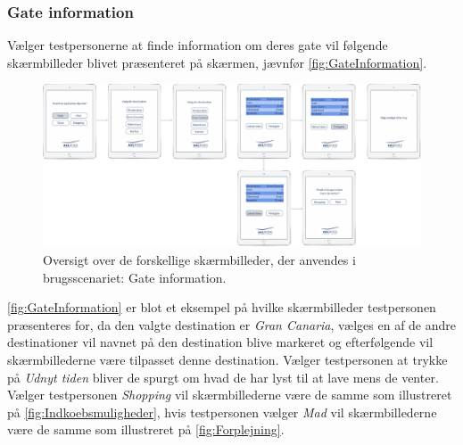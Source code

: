 \subsubsection*{Gate information}
%
Vælger testpersonerne at finde information om deres gate vil følgende skærmbilleder blivet præsenteret på skærmen, jævnfør \autoref{fig:GateInformation}. 
%
\begin{figure}[H]
\centering
\includegraphics[width = \textwidth]{Figure/TestdesignParametre/GateInformation} 
\caption{Oversigt over de forskellige skærmbilleder, der anvendes i brugsscenariet: Gate information.}
\label{fig:GateInformation}
\end{figure}
\noindent
%
\autoref{fig:GateInformation} er blot et eksempel på hvilke skærmbilleder testpersonen præsenteres for, da den valgte destination er \textit{Gran Canaria}, vælges en af de andre destinationer vil navnet på den destination blive markeret og efterfølgende vil skærmbillederne være tilpasset denne destination. Vælger testpersonen at trykke på \textit{Udnyt tiden} bliver de spurgt om hvad de har lyst til at lave mens de venter. Vælger testpersonen \textit{Shopping} vil skærmbillederne være de samme som illustreret på \autoref{fig:Indkoebsmuligheder}, hvis testpersonen vælger \textit{Mad} vil skærmbillederne være de samme som illustreret på \autoref{fig:Forplejning}.  
\newpage
%
